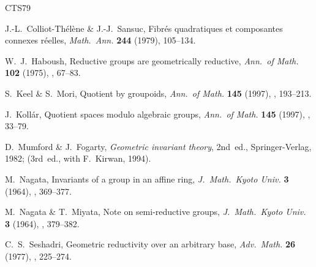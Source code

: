 \renewcommand{\bibname}{Bibliography}
\begin{thebibliography}{CTS79}

J.-L.~Colliot-Th\'el\`ene \& J.-J.~Sansuc, Fibr\'es quadratiques et
composantes connexes r\'eelles, \emph{Math.\ Ann.} \textbf{244} (1979),
105--134.

W.~J.~Haboush, Reductive groups are geometrically reductive, \emph{Ann.\ of
Math.} \textbf{102} (1975), , 67--83.

S.~Keel \& S.~Mori, Quotient by groupoids, \emph{Ann.\ of Math.}
\textbf{145} (1997), , 193--213.

J.~Koll\'ar, Quotient spaces modulo algebraic groups, \emph{Ann.\ of Math.}
\textbf{145} (1997), , 33--79.

D.~Mumford \& J.~Fogarty, \emph{Geometric invariant theory}, 2nd~ed.,
Springer-Verlag, 1982; (\resp 3rd~ed., with F.~Kirwan, 1994).

M.~Nagata, Invariants of a group in an affine ring, \emph{J.\ Math.\ Kyoto
Univ.} \textbf{3} (1964), , 369--377.

M.~Nagata \& T.~Miyata, Note on semi-reductive groups, \emph{J.\ Math.\ Kyoto
Univ.} \textbf{3} (1964), , 379--382.

C.~S.~Seshadri, Geometric reductivity over an arbitrary base, \emph{Adv.\
Math.} \textbf{26} (1977), , 225--274.

\end{thebibliography}
